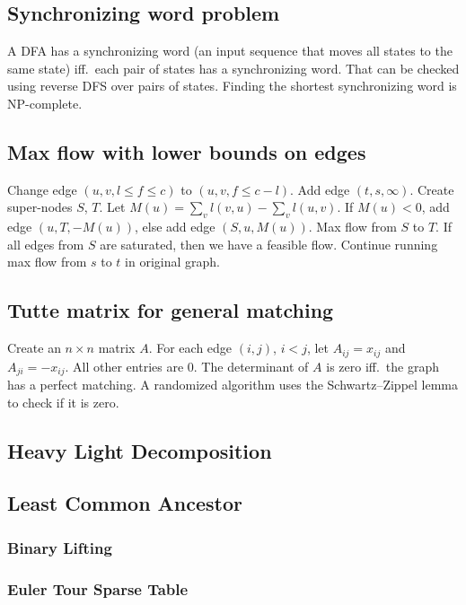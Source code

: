   \subsection{Synchronizing word problem}
    A DFA has a synchronizing word (an input sequence that moves all states
    to the same state) iff.\ each pair of states has a synchronizing word.
    That can be checked using reverse DFS over pairs of states. Finding the
    shortest synchronizing word is NP-complete.
  \subsection{Max flow with lower bounds on edges}
    Change edge $(u,v,l\leq f\leq c)$ to $(u,v,f\leq c-l)$. Add edge
    $(t,s,\infty)$. Create super-nodes $S$, $T$. Let $M(u) = \sum_{v}
    l(v,u) - \sum_{v} l(u,v)$. If $M(u)<0$, add edge $(u,T,-M(u))$, else
    add edge $(S,u,M(u))$. Max flow from $S$ to $T$. If all edges from $S$
    are saturated, then we have a feasible flow. Continue running max flow
    from $s$ to $t$ in original graph.
  \subsection{Tutte matrix for general matching}
    Create an $n\times n$ matrix $A$. For each edge $(i,j)$, $i<j$, let
    $A_{ij} = x_{ij}$ and $A_{ji} = -x_{ij}$. All other entries are $0$.
    The determinant of $A$ is zero iff.\ the graph has a perfect matching.
    A randomized algorithm uses the Schwartz--Zippel lemma to check if it is
    zero.
  \subsection{Heavy Light Decomposition}
	\subsection{Least Common Ancestor}
		\subsubsection{Binary Lifting}
    \subsubsection{Euler Tour Sparse Table}

